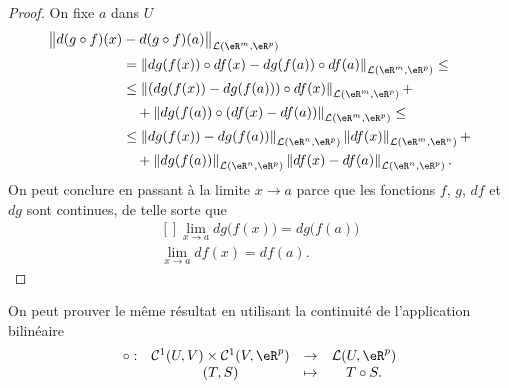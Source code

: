 \begin{proof} On fixe $a$ dans $U$ 
  \begin{equation}
    \begin{aligned}
     \big\|d(g\circ f)(x)&-d(g\circ f)(a)\big\|_{\mathcal{L}(\eR^m,\eR^p)}\\
     &=\left\|dg(f(x))\circ df(x)-dg(f(a))\circ df(a)\right\|_{\mathcal{L}(\eR^m,\eR^p)}\leq\\
&\leq \left\|\left(dg(f(x))-dg(f(a))\right)\circ df(x)\right\|_{\mathcal{L}(\eR^m,\eR^p)}+\\
&\quad+ \left\|dg(f(a))\circ \left(df(x)-df(a)\right)\right\|_{\mathcal{L}(\eR^m,\eR^p)}\leq\\
&\leq \left\|dg(f(x))-dg(f(a))\right\|_{\mathcal{L}(\eR^n,\eR^p)}\left\| df(x)\right\|_{\mathcal{L}(\eR^m,\eR^n)}+\\
&\quad+ \left\|dg(f(a))\right\|_{\mathcal{L}(\eR^n,\eR^p)}\left\| df(x)-df(a)\right\|_{\mathcal{L}(\eR^n,\eR^p)}.\\
    \end{aligned}
  \end{equation}
On peut conclure en passant à la limite $x\to a$ parce que les fonctions $f$, $g$, $df$ et $dg$ sont continues, de telle sorte que
\begin{equation}
	\begin{aligned}[]
		\lim_{x\to a} dg\big( f(x) \big)=dg\big( f(a) \big)\\
		\lim_{x\to a} df(x)=df(a).
	\end{aligned}
\end{equation}
\end{proof}

\begin{remark}
  On peut prouver le même résultat en utilisant la continuité de l'application bilinéaire 
\begin{equation}
  \begin{array}{rccc}
    \circ : & \mathcal{C}^1(U,V)\times\mathcal{C}^1(V,\eR^p)  & \to & \mathcal{L}(U, \eR^p)\\
& (T,S)& \mapsto & T\circ S.
  \end{array}
\end{equation}
\end{remark}
